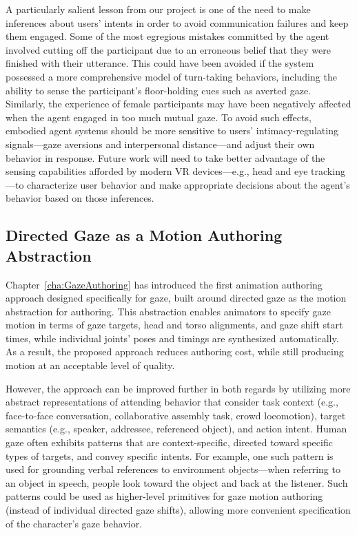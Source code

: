 A particularly salient lesson from our project is one of the need to make inferences about users' intents in order to avoid communication failures and keep them engaged. Some of the most egregious mistakes committed by the agent involved cutting off the participant due to an erroneous belief that they were finished with their utterance. This could have been avoided if the system possessed a more comprehensive model of turn-taking behaviors, including the ability to sense the participant's floor-holding cues such as averted gaze. Similarly, the experience of female participants may have been negatively affected when the agent engaged in too much mutual gaze. To avoid such effects, embodied agent systems should be more sensitive to users' intimacy-regulating signals---gaze aversions and interpersonal distance---and adjust their own behavior in response. Future work will need to take better advantage of the sensing capabilities afforded by modern VR devices---e.g., head and eye tracking---to characterize user behavior and make appropriate decisions about the agent's behavior based on those inferences.

\subsection{Directed Gaze as a Motion Authoring Abstraction}

Chapter~\ref{cha:GazeAuthoring} has introduced the first animation authoring approach designed specifically for gaze, built around directed gaze as the motion abstraction for authoring.
This abstraction enables animators to specify gaze motion in terms of gaze targets, head and torso alignments, and gaze shift start times, while individual joints' poses and timings are synthesized automatically. As a result, the proposed approach reduces authoring cost, while still producing motion at an acceptable level of quality.

However, the approach can be improved further in both regards by utilizing more abstract representations of attending behavior that consider task context (e.g., face-to-face conversation, collaborative assembly task, crowd locomotion), target semantics (e.g., speaker, addressee, referenced object), and action intent. Human gaze often exhibits patterns that are context-specific, directed toward specific types of targets, and convey specific intents. For example, one such pattern is used for grounding verbal references to environment objects---when referring to an object in speech, people look toward the object and back at the listener. Such patterns could be used as higher-level primitives for gaze motion authoring (instead of individual directed gaze shifts), allowing more convenient specification of the character's gaze behavior.

